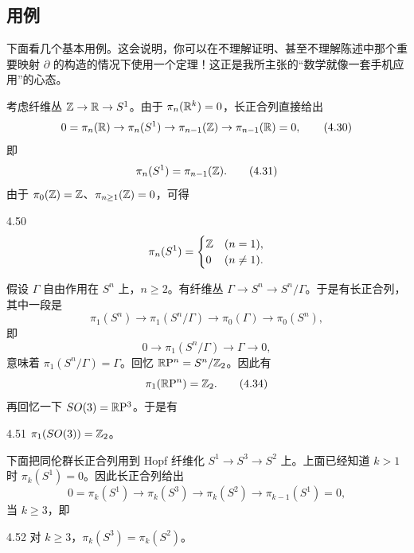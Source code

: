 \subsection{用例}

下面看几个基本用例。这会说明，你可以在不理解证明、甚至不理解陈述中那个重要映射 $\partial$ 的构造的情况下使用一个定理！这正是我所主张的“数学就像一套手机应用”的心态。

考虑纤维丛 $\mathbb{Z}\to\mathbb{R}\to S^1$。由于 $\pi_n(\mathbb{R}^k)=0$，长正合列直接给出
\begin{equation}
0=\pi_n(\mathbb{R})\to\pi_n(S^1)\to\pi_{n-1}(\mathbb{Z})\to\pi_{n-1}(\mathbb{R})=0,
\tag{4.30}
\end{equation}
即
\begin{equation}
\pi_n(S^1)=\pi_{n-1}(\mathbb{Z}).
\tag{4.31}
\end{equation}
由于 $\pi_0(\mathbb{Z})=\mathbb{Z}$、$\pi_{n\ge 1}(\mathbb{Z})=0$，可得

\begin{example}{4.50}
\[
\pi_n(S^1)=\begin{cases}\mathbb{Z} & (n=1),\\ 0 & (n\neq 1).\end{cases}
\]
\end{example}

假设 $\Gamma$ 自由作用在 $S^n$ 上，$n\ge 2$。有纤维丛 $\Gamma\to S^n\to S^n/\Gamma$。于是有长正合列，其中一段是
\begin{equation}
\pi_1(S^n)\to\pi_1(S^n/\Gamma)\to\pi_0(\Gamma)\to\pi_0(S^n),
\tag{4.32}
\end{equation}
即
\begin{equation}
0\to\pi_1(S^n/\Gamma)\to\Gamma\to 0,
\tag{4.33}
\end{equation}
意味着 $\pi_1(S^n/\Gamma)=\Gamma$。回忆 $\mathbb{R}\mathrm{P}^n=S^n/\mathbb{Z}_2$。因此有
\begin{equation}
\pi_1(\mathbb{R}\mathrm{P}^n)=\mathbb{Z}_2.
\tag{4.34}
\end{equation}
再回忆一下 $SO(3)=\mathbb{R}\mathrm{P}^3$。于是有

\begin{example}{4.51}
$\pi_1(SO(3))=\mathbb{Z}_2$。
\end{example}

下面把同伦群长正合列用到 Hopf 纤维化 $S^1\to S^3\to S^2$ 上。上面已经知道 $k>1$ 时 $\pi_k(S^1)=0$。因此长正合列给出
\begin{equation}
0=\pi_k(S^1)\to\pi_k(S^3)\to\pi_k(S^2)\to\pi_{k-1}(S^1)=0,
\tag{4.35}
\end{equation}
当 $k\ge 3$，即

\begin{proposition}{4.52}
对 $k\ge 3$，$\pi_k(S^3)=\pi_k(S^2)$。
\end{proposition}

